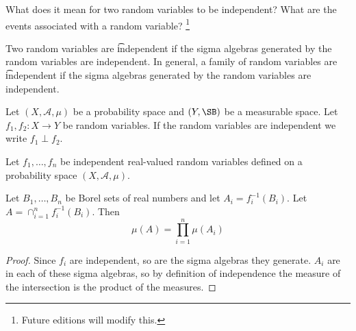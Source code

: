 

What does it mean for two random variables to be independent?
What are the events associated with a random variable?
  \ifhmode\unskip\fi\footnote{
Future editions will modify this.
  }


Two random variables are \t{independent} if the sigma algebras generated by the random variables are independent.
In general, a family of random variables are \t{independent} if the sigma algebras generated by the random variables are independent.


Let $(X, \mathcal{A} , \mu )$ be a probability space and $(Y, \SB)$ be a measurable space.
Let $f_1,f_2: X \to Y$ be random variables.
If the random variables are independent we write $f_1 \perp f_2$.


\begin{prop}
Let $f_1, \dots, f_n$ be independent real-valued random variables defined on a probability space $(X, \mathcal{A} , \mu )$.

Let $B_1, \dots, B_n$ be Borel sets of real numbers and let $A_i = f_i^{-1}(B_i)$.
Let $A = \cap_{i = 1}^{n} f_i^{-1}(B_i)$.
Then
  \[
\mu (A) = \prod_{i = 1}^{n} \mu (A_i)
  \]
\begin{proof}
Since $f_i$ are independent, so are the sigma algebras they generate.
$A_i$ are in each of these sigma algebras, so by definition of independence the measure of the intersection is the product of the measures.
\end{proof}
\end{prop}
